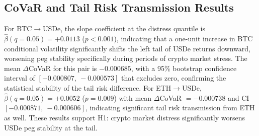 \documentclass[12pt,a4paper,titlepage,oneside,english]{article}
\begin{document}
\subsection{CoVaR and Tail Risk Transmission Results}
For BTC$\to$USDe, the slope coefficient at the distress quantile is
$\hat{\beta}(q=0.05) = +0.0113$ ($p < 0.001$), indicating that a one-unit increase
in BTC conditional volatility significantly shifts the left tail of USDe returns
downward, worsening peg stability specifically during periods of crypto market
stress. The mean $\Delta$CoVaR for this pair is $-0.000685$, with a 95\% bootstrap
confidence interval of $[-0.000807,\ -0.000573]$ that excludes zero, confirming the
statistical stability of the tail risk difference. For ETH$\to$USDe,
$\hat{\beta}(q=0.05) = +0.0052$ ($p = 0.009$) with mean $\Delta$CoVaR $= -0.000738$
and CI $[-0.000871,\ -0.000606]$, indicating significant tail risk transmission from
ETH as well. These results support H1: crypto market distress significantly worsens
USDe peg stability at the tail.\\
\end{document}

